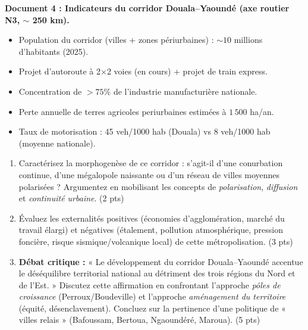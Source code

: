 \documentclass[11pt]{article}
\begin{document}
\begin{exercice}
\textbf{Document 4 : Indicateurs du corridor Douala--Yaoundé (axe routier N3, $\sim$ 250 km).}
\begin{itemize}
    \item Population du corridor (villes + zones périurbaines) : $\sim 10$ millions d'habitants (2025).
    \item Projet d'autoroute à 2$\times$2 voies (en cours) + projet de train express.
    \item Concentration de $> 75\%$ de l'industrie manufacturière nationale.
    \item Perte annuelle de terres agricoles periurbaines estimées à $1\,500$ ha/an.
    \item Taux de motorisation : 45 veh/1000 hab (Douala) vs 8 veh/1000 hab (moyenne nationale).
\end{itemize}

\begin{enumerate}
    \item Caractérisez la morphogenèse de ce corridor : s'agit-il d'une conurbation continue, d'une mégalopole naissante ou d'un réseau de villes moyennes polarisées ? Argumentez en mobilisant les concepts de \textit{polarisation}, \textit{diffusion} et \textit{continuité urbaine}. (2 pts)
    \item Évaluez les externalités positives (économies d'agglomération, marché du travail élargi) et négatives (étalement, pollution atmosphérique, pression foncière, risque sismique/volcanique local) de cette métropolisation. (3 pts)
    \item \textbf{Débat critique :} « Le développement du corridor Douala--Yaoundé accentue le déséquilibre territorial national au détriment des trois régions du Nord et de l'Est. » Discutez cette affirmation en confrontant l'approche \textit{pôles de croissance} (Perroux/Boudeville) et l'approche \textit{aménagement du territoire} (équité, désenclavement). Concluez sur la pertinence d'une politique de « villes relais » (Bafoussam, Bertoua, Ngaoundéré, Maroua). (5 pts)
\end{enumerate}
\end{exercice}
\end{document}
